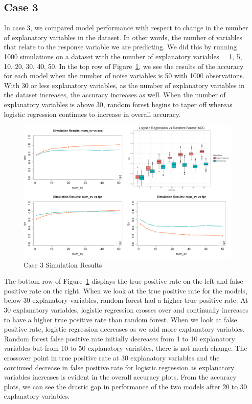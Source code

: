 \documentclass{llncs}
\begin{document}
\subsection{Case 3}
\noindent 
In case 3, we compared model performance with respect to change in the number of explanatory variables in the dataset.  In other words, the number of variables that relate to the response variable we are predicting. We did this by running 1000 simulations on a dataset with the number of explanatory variables = 1, 5, 10, 20, 30, 40, 50.  In the top row of Figure~\ref{fig:case3results}, we see the results of the accuracy for each model when the number of noise variables is 50 with 1000 observations.  With 30 or less explanatory variables, as the number of explanatory variables in the dataset increases, the accuracy increases as well.  When the number of explanatory variables is above 30, random forest begins to taper off whereas logistic regression continues to increase in overall accuracy. 

\begin{figure}
\centering
\includegraphics[scale=0.55]{case3.png}
\caption{Case 3 Simulation Results}
\label{fig:case3results}
\end{figure}

\noindent 
The bottom row of Figure~\ref{fig:case3results} displays the true positive rate on the left and false positive rate on the right.  When we look at the true positive rate for the models, below 30 explanatory variables, random forest had a higher true positive rate.  At 30 explanatory variables, logistic regression crosses over and continually increases to have a higher true positive rate than random forest.  When we look at false positive rate, logistic regression decreases as we add more explanatory variables.  Random forest false positive rate initially decreases from 1 to 10 explanatory variables but from 10 to 50 explanatory variables, there is not much change.  The crossover point in true positive rate at 30 explanatory variables and the continued decrease in false positive rate for logistic regression as explanatory variables increases is evident in the overall accuracy plots.  From the accuracy plots, we can see the drastic gap in performance of the two models after 20 to 30 explanatory variables.
\end{document}
